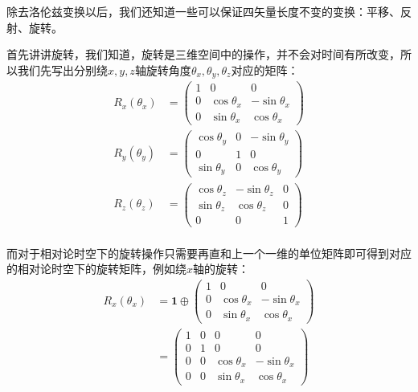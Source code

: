 除去洛伦兹变换以后，我们还知道一些可以保证四矢量长度不变的变换：平移、反射、旋转。

首先讲讲旋转，我们知道，旋转是三维空间中的操作，并不会对时间有所改变，所以我们先写出分别绕$x,y,z$轴旋转角度$\theta_x,\theta_y,\theta_z$对应的矩阵：
\begin{align*}
    R_x(\theta_x)&=
    \begin{pmatrix}
    1&0&0\\
    0&\cos\theta_x&-\sin\theta_x\\
    0&\sin\theta_x&\cos\theta_x    
    \end{pmatrix}\\
    R_y(\theta_y)&=
    \begin{pmatrix}
    \cos\theta_y&0&-\sin\theta_y\\
    0&1&0\\
    \sin\theta_y&0&\cos\theta_y   
    \end{pmatrix}\\
    R_z(\theta_z)&=
    \begin{pmatrix}
        \cos\theta_z&-\sin\theta_z&0\\
        \sin\theta_z&\cos\theta_z&0\\
        0&0&1   
        \end{pmatrix}\\
\end{align*}

而对于相对论时空下的旋转操作只需要再直和上一个一维的单位矩阵即可得到对应的相对论时空下的旋转矩阵，例如绕$x$轴的旋转：
\begin{align*}
    R_x(\theta_x)&=\mathbf{1}\oplus
    \begin{pmatrix}
        1&0&0\\
        0&\cos\theta_x&-\sin\theta_x\\
        0&\sin\theta_x&\cos\theta_x    
        \end{pmatrix}\\
    &=
    \begin{pmatrix}
        1&0&0&0\\
        0&1&0&0\\
        0&0&\cos\theta_x&-\sin\theta_x\\
        0&0&\sin\theta_x&\cos\theta_x
    \end{pmatrix}\\
\end{align*}

